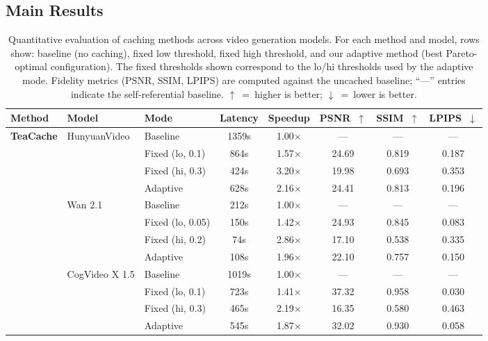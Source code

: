 \documentclass{article}
\begin{document}
\subsection{Main Results}

\begin{table}[t]
\centering
\small
\caption{Quantitative evaluation of caching methods across video generation models. For each method and model, rows show: baseline (no caching), fixed low threshold, fixed high threshold, and our adaptive method (best Pareto-optimal configuration). The fixed thresholds shown correspond to the lo/hi thresholds used by the adaptive mode. Fidelity metrics (PSNR, SSIM, LPIPS) are computed against the uncached baseline; ``---'' entries indicate the self-referential baseline. $\uparrow$~=~higher is better; $\downarrow$~=~lower is better.}
\label{tab:main_results}
\renewcommand{\arraystretch}{1.1}
\begin{tabular}{lllccccc}
\toprule
\textbf{Method} & \textbf{Model} & \textbf{Mode} & \textbf{Latency} & \textbf{Speedup} & \textbf{PSNR~$\uparrow$} & \textbf{SSIM~$\uparrow$} & \textbf{LPIPS~$\downarrow$} \\
\midrule

\multirow{12}{*}{\textbf{TeaCache}}
  & \multirow{4}{*}{HunyuanVideo}
    & Baseline          & 1359s & 1.00$\times$ & ---   & ---   & ---   \\
  & & Fixed (lo, 0.1)   & 864s  & 1.57$\times$ & 24.69 & 0.819 & 0.187 \\
  & & Fixed (hi, 0.3)   & 424s  & 3.20$\times$ & 19.98 & 0.693 & 0.353 \\
  & & Adaptive          & 628s  & 2.16$\times$ & 24.41 & 0.813 & 0.196 \\
\cmidrule{2-8}
  & \multirow{4}{*}{Wan 2.1}
    & Baseline          & 212s  & 1.00$\times$ & ---   & ---   & ---   \\
  & & Fixed (lo, 0.05)  & 150s & 1.42$\times$ & 24.93 & 0.845 & 0.083 \\
  & & Fixed (hi, 0.2)   & 74s   & 2.86$\times$ & 17.10 & 0.538 & 0.335 \\
  & & Adaptive          & 108s  & 1.96$\times$ & 22.10 & 0.757 & 0.150 \\
\cmidrule{2-8}
  & \multirow{4}{*}{CogVideo X 1.5}
    & Baseline          & 1019s & 1.00$\times$ & ---   & ---   & ---   \\
  & & Fixed (lo, 0.1)   & 723s  & 1.41$\times$ & 37.32 & 0.958 & 0.030 \\
  & & Fixed (hi, 0.3)   & 465s  & 2.19$\times$ & 16.35 & 0.580 & 0.463 \\
  & & Adaptive          & 545s  & 1.87$\times$ & 32.02 & 0.930 & 0.058 \\
\midrule


\end{tabular}
\end{table}
\end{document}
